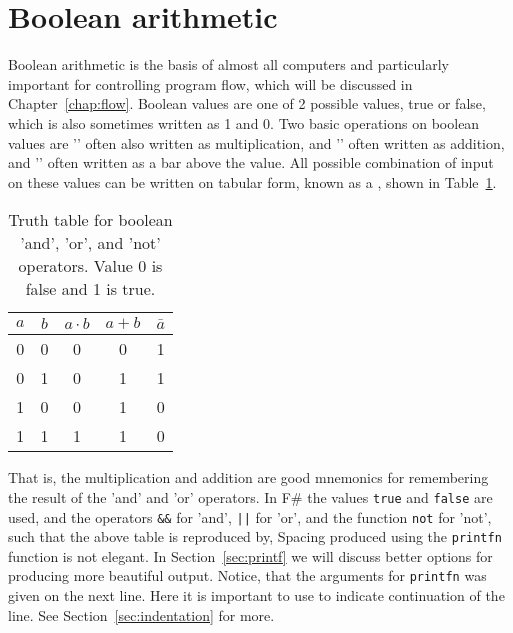\section{Boolean arithmetic}
Boolean arithmetic is the basis of almost all computers and particularly important for controlling program flow, which will be discussed in Chapter~\ref{chap:flow}. Boolean values are one of 2 possible values, true or false, which is also sometimes written as 1 and 0. Two basic operations on boolean values are '' often also written as multiplication, and '' often written as addition, and '' often written as a bar above the value. All possible combination of input on these values can be written on tabular form, known as a , shown in Table~\ref{tab:truthTable}.
\begin{table}
  \centering
  \begin{tabular}{|c|c|c|c|c|}
    \hline
    $a$ & $b$ & $a\cdot b$& $a + b$&$\bar{a}$\\
    \hline
    0&0&0&0&1\\
    0&1&0&1&1\\
    1&0&0&1&0\\
    1&1&1&1&0\\
    \hline
  \end{tabular}
  \caption{Truth table for boolean 'and', 'or', and 'not' operators. Value 0 is false and 1 is true.}
  \label{tab:truthTable}
\end{table}
That is, the multiplication and addition are good mnemonics for remembering the result of the 'and' and 'or' operators. In F\# the values \lstinline|true| and \lstinline|false| are used, and the operators \lstinline|&&| for 'and', \lstinline+||+ for 'or', and the function \lstinline|not| for 'not', such that the above table is reproduced by,
%
%
%
Spacing produced using the \lstinline|printfn| function is not elegant. In Section~\ref{sec:printf} we will discuss better options for producing more beautiful output. Notice, that the arguments for \lstinline|printfn| was given on the next line. Here it is important to use  to indicate continuation of the line. See Section~\ref{sec:indentation} for more.

